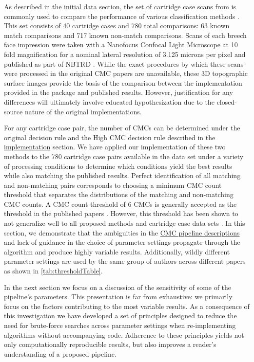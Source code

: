 As described in the \protect\hyperlink{initialData}{initial data}
section, the set of cartridge case scans from
\citet{fadul_empirical_2011} is commonly used to compare the performance
of various classification methods
\citep{song_3d_2014, tong_improved_2015, chen_convergence_2017}. This
set consists of 40 cartridge cases and 780 total comparisons: 63 known
match comparisons and 717 known non-match comparisons. Scans of each
breech face impression were taken with a Nanofocus Confocal Light
Microscope at 10 fold magnification for a nominal lateral resolution of
3.125 microns per pixel and published as part of NBTRD \citep{nbtrd}.
While the exact procedures by which these scans were processed in the
original CMC papers are unavailable, these 3D topographic surface images
provide the basis of the comparison between the implementation provided
in the  package and published results. However,
justification for any differences will ultimately involve educated
hypothesization due to the closed-source nature of the original
implementations.

For any cartridge case pair, the number of CMCs can be determined under
the original decision rule and the High CMC decision rule described in
the \protect\hyperlink{implementation}{implementation} section. We have
applied our implementation of these two methods to the 780 cartridge
case pairs available in the \citet{fadul_empirical_2011} data set under
a variety of processing conditions to determine which conditions yield
the best results while also matching the published results. Perfect
identification of all matching and non-matching pairs corresponds to
choosing a minimum CMC count threshold that separates the distributions
of the matching and non-matching CMC counts. A CMC count threshold of 6
CMCs is generally accepted as the threshold in the published papers
\citep{tong_improved_2015,song_estimating_2018,song_proposed_2013}.
However, this threshold has been shown to not generalize well to all
proposed methods and cartridge case data sets
\citep{chen_convergence_2017}. In this section, we demonstrate that the
ambiguities in the \href{cmcMethod}{CMC pipeline descriptions} and lack
of guidance in the choice of parameter settings propagate through the
algorithm and produce highly variable results. Additionally, wildly
different parameter settings are used by the same group of authors
across different papers as shown in \autoref{tab:thresholdTable}.

In the next section we focus on a discussion of the sensitivity of some
of the pipeline's parameters. This presentation is far from exhaustive:
we primarily focus on the factors contributing to the most variable
results. As a consequence of this investigation we have developed a set
of principles designed to reduce the need for brute-force searches
across parameter settings when re-implementing algorithms without
accompanying code. Adherence to these principles yields not only
computationally reproducible results, but also improves a reader's
understanding of a proposed pipeline.

